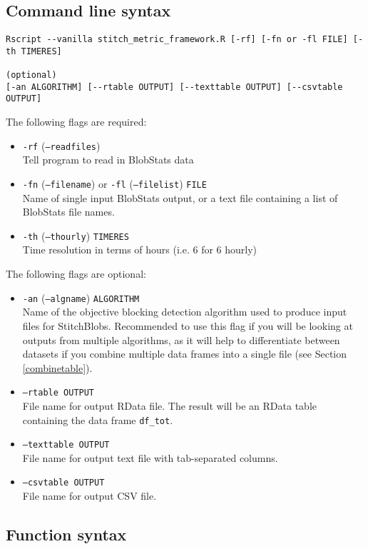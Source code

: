 \documentclass{article}
\begin{document}
\subsection{Command line syntax}
\begin{verbatim}
Rscript --vanilla stitch_metric_framework.R [-rf] [-fn or -fl FILE] [-th TIMERES] 

(optional)
[-an ALGORITHM] [--rtable OUTPUT] [--texttable OUTPUT] [--csvtable OUTPUT]
\end{verbatim}

The following flags are required:
\begin{itemize}
\item[] \texttt{-rf} (\texttt{--readfiles}) \\ Tell program to read in BlobStats data
\item[]\texttt{-fn} (\texttt{--filename}) or \texttt{-fl} (\texttt{--filelist}) \texttt{FILE}\\ Name of single input BlobStats output, or a text file containing a list of BlobStats file names.
\item[]\texttt{-th} (\texttt{--thourly}) \texttt{TIMERES}\\ Time resolution in terms of hours (i.e. 6 for 6 hourly)
\end{itemize}

The following flags are optional:
\begin{itemize}
\item[]\texttt{-an} (\texttt{--algname}) \texttt{ALGORITHM}\\ Name of the objective blocking detection algorithm used to produce input files for StitchBlobs. Recommended to use this flag if you will be looking at outputs from multiple algorithms, as it will help to differentiate between datasets if you combine multiple data frames into a single file (see Section \ref{combinetable}).
\item[] \texttt{--rtable OUTPUT}\\ File name for output RData file. The result will be an RData table containing the data frame \texttt{df\_tot}.
\item[] \texttt{--texttable OUTPUT}\\ File name for output text file with tab-separated columns.
\item[] \texttt{--csvtable OUTPUT}\\File name for output CSV file. 
\end{itemize}
\subsection{Function syntax}
\end{document}
